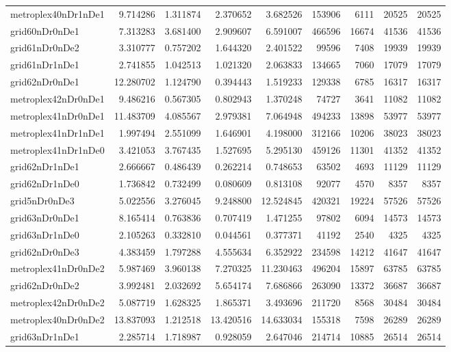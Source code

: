 \documentclass[../../../thesis.tex]{subfiles}
\begin{document}
\begin{longtable}{|l|r|r|r|r|r|r|r|r|}
metroplex40nDr1nDe1 & 9.714286 & 1.311874 & 2.370652 & 3.682526 & 153906 & 6111 & 20525 & 20525 \\
grid60nDr0nDe1 & 7.313283 & 3.681400 & 2.909607 & 6.591007 & 466596 & 16674 & 41536 & 41536 \\
grid61nDr0nDe2 & 3.310777 & 0.757202 & 1.644320 & 2.401522 & 99596 & 7408 & 19939 & 19939 \\
grid61nDr1nDe1 & 2.741855 & 1.042513 & 1.021320 & 2.063833 & 134665 & 7060 & 17079 & 17079 \\
grid62nDr0nDe1 & 12.280702 & 1.124790 & 0.394443 & 1.519233 & 129338 & 6785 & 16317 & 16317 \\
metroplex42nDr0nDe1 & 9.486216 & 0.567305 & 0.802943 & 1.370248 & 74727 & 3641 & 11082 & 11082 \\
metroplex41nDr0nDe1 & 11.483709 & 4.085567 & 2.979381 & 7.064948 & 494233 & 13898 & 53977 & 53977 \\
metroplex41nDr1nDe1 & 1.997494 & 2.551099 & 1.646901 & 4.198000 & 312166 & 10206 & 38023 & 38023 \\
metroplex41nDr1nDe0 & 3.421053 & 3.767435 & 1.527695 & 5.295130 & 459126 & 11301 & 41352 & 41352 \\
grid62nDr1nDe1 & 2.666667 & 0.486439 & 0.262214 & 0.748653 & 63502 & 4693 & 11129 & 11129 \\
grid62nDr1nDe0 & 1.736842 & 0.732499 & 0.080609 & 0.813108 & 92077 & 4570 & 8357 & 8357 \\
grid5nDr0nDe3 & 5.022556 & 3.276045 & 9.248800 & 12.524845 & 420321 & 19224 & 57526 & 57526 \\
grid63nDr0nDe1 & 8.165414 & 0.763836 & 0.707419 & 1.471255 & 97802 & 6094 & 14573 & 14573 \\
grid63nDr1nDe0 & 2.105263 & 0.332810 & 0.044561 & 0.377371 & 41192 & 2540 & 4325 & 4325 \\
grid62nDr0nDe3 & 4.383459 & 1.797288 & 4.555634 & 6.352922 & 234598 & 14212 & 41647 & 41647 \\
metroplex41nDr0nDe2 & 5.987469 & 3.960138 & 7.270325 & 11.230463 & 496204 & 15897 & 63785 & 63785 \\
grid62nDr0nDe2 & 3.992481 & 2.032692 & 5.654174 & 7.686866 & 263090 & 13372 & 36687 & 36687 \\
metroplex42nDr0nDe2 & 5.087719 & 1.628325 & 1.865371 & 3.493696 & 211720 & 8568 & 30484 & 30484 \\
metroplex40nDr0nDe2 & 13.837093 & 1.212518 & 13.420516 & 14.633034 & 155318 & 7598 & 26289 & 26289 \\
grid63nDr1nDe1 & 2.285714 & 1.718987 & 0.928059 & 2.647046 & 214714 & 10885 & 26514 & 26514 \\

\end{longtable}
\end{document}
